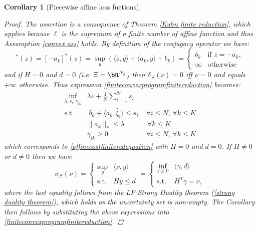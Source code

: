 \documentclass[11pt,a4paper,oneside,openany]{book}
\newtheorem{corollary}{Corollary}[theorem]
\numberwithin{definition}{section}
\numberwithin{theorem}{section}
\numberwithin{problem}{section}
\begin{document}
\begin{corollary}[Piecewise affine loss fuctions]
\begin{proof}
    The assertion is a consequence of Theorem \ref{Kuhn finite reduction}, which applies because $\ell$ is the supremum of a finite number of affine function and thus Assumption \ref{convex ass} holds. By definition of the conjugacy operator we have:
    \begin{equation*}
    [-\ell_k]^*(z) =  [-a_k]^*(z) = \sup_{y} \left( \langle z, y\rangle + \langle a_k, y \rangle + b_k \right) 
    = 
    \begin{cases}
        b_k & \text{if } z = -a_k, \\
        \infty & \text{otherwise}
    \end{cases}
    \end{equation*}
    and if $H = 0$ and $d = 0$ (i.e. $\Xi = \bR^{N_{\xi}}$) then $\delta_{\Xi}(\nu) = 0$ iff $\nu = 0$ and equals $+\infty$ otherwise. Thus expression \eqref{finiteconvexprogramfinitereduction} becomes:
      \begin{align}
        \inf_{\lambda,s_i,\gamma_{ik}} & \lambda\varepsilon + \frac{1} {N}\sum_{i=1}^N s_i & \\
        \text{s.t.} &\; b_k + \langle a_k, \hat \xi_i\rangle \leq s_i \;& \forall i \leq N, \, \forall k \leq K \\
        & \|a_k\|_* \leq \lambda  \;&  \, \forall k \leq K \\
        &\gamma_{ik} \geq 0  \;& \forall i \leq N, \, \forall k \leq K 
    \end{align}
    which corresponds to \eqref{affinecostfiniteredequation} with $H=0$ and $d=0$. If $H \neq 0$ or $ d \neq 0$ then we have
    \begin{equation*}
        \sigma_{\Xi}(\nu)= 
        \begin{cases}
            \sup_{y}&\langle \nu,y\rangle \\
            \text{s.t.}& Hy \leq d
        \end{cases}
        =
        \begin{cases}
            \inf_{\gamma \geq 0}& \langle \gamma, d \rangle \\
            \text{s.t.}& H^T\gamma = \nu,
        \end{cases}
    \end{equation*}
    where the last equality follows from the LP Strong Duality theorem (\ref{strong duality theorem}), which holds as the uncertainty set is non-empty. The Corollary then follows by substituting the above expressions into \eqref{finiteconvexprogramfinitereduction}.
\end{proof}

\end{corollary}
\end{document}
